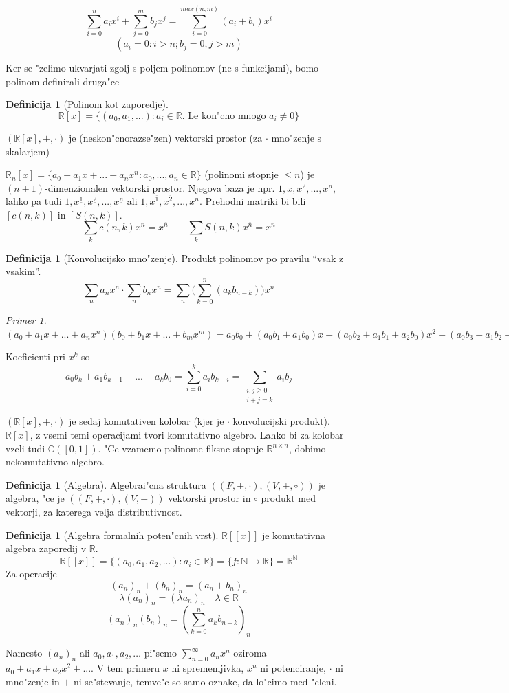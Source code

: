 \documentclass[a4paper,12pt]{article}
\theoremstyle{definition}
\newtheorem{defn}[counter]{Definicija}
\theoremstyle{remark}
\newtheorem*{ex}{Primer}
\newcommand{\N}{\mathbb{N}}
\newcommand{\R}{\mathbb{R}}
\newcommand{\C}{\mathbb{C}}
\begin{document}
\[\sum_{i = 0}^n a_i x^{i} + \sum_{j = 0}^m b_j x^j = \sum_{i = 0}^{max(n, m)}(a_i + b_i)x^{i}\]
\[(a_i = 0: i > n; b_j = 0, j > m)\]

Ker se "zelimo ukvarjati zgolj s poljem polinomov (ne s funkcijami), bomo polinom definirali druga"ce
\begin{defn}[Polinom kot zaporedje]
	\[\R[x] = \{(a_0, a_1, ...): a_i \in \R. \text{ Le kon"cno mnogo }a_i \neq 0\}\]
\end{defn}

$(\R[x], +, \cdot)$ je (neskon"cnorazse"zen) vektorski prostor (za $\cdot$ mno"zenje s skalarjem)

$\R_n[x] = \{a_0 + a_1 x + ... + a_n x^n: a_0, ..., a_n \in \R\}$ (polinomi stopnje $\leqslant n$) je $(n + 1)$-dimenzionalen vektorski prostor. Njegova baza je npr. $1, x, x^2, ..., x^n$, lahko pa tudi $1, x^{\underline{1}}, x^{\underline{2}}, ..., x^{\underline{n}}$ ali $1, x^{\overline{1}}, x^{\overline{2}}, ..., x^{\overline{n}}$. Prehodni matriki bi bili $[c(n, k)]$ in $[S(n, k)]$.
\[
	\sum_k c(n, k) x^n = x^{\overline{n}}
	\qquad
	\sum_k S(n, k) x^{\overline{n}} = x^n
\]

\begin{defn}[Konvolucijsko mno"zenje]
	Produkt polinomov po pravilu ``vsak z vsakim''.
	\[\sum_na_nx^n \cdot \sum_nb_nx^n = \sum_n\big(\sum_{k=0}^n(a_kb_{n-k})\big)x^n\]
\end{defn}
\begin{ex}
	$(a_0 + a_1 x + ... + a_n x^n)(b_0 + b_1 x + ... + b_m x^m) = a_0 b_0 + (a_0 b_1 + a_1 b_0)x + (a_0 b_2 + a_1 b_ 1 + a_2 b_0) x^2 + (a_0 b_3 + a_1 b_2 + a_2 b_1 + a_3 b_0)x^3 + ... + a_n b_m x^{n + m}$
\end{ex}
Koeficienti pri $x^k$ so
\[a_0 b_k + a_1 b_{k - 1} + ... + a_k b_0 = \sum_{i = 0}^k a_i b_{k - i} = \sum_{\substack{i, j \geqslant 0 \\ i + j = k}} a_i b_j\]

$(\R[x], +, \cdot)$ je sedaj komutativen kolobar (kjer je $\cdot$ konvolucijski produkt). $\R[x]$, z vsemi temi operacijami tvori komutativno algebro. Lahko bi za kolobar vzeli tudi $\C([0, 1])$. "Ce vzamemo polinome fiksne stopnje $\R^{n \times n}$, dobimo nekomutativno algebro.

\begin{defn}[Algebra]
	Algebrai"cna struktura $((F, +, \cdot), (V, +, \circ))$ je algebra, "ce je $((F, +, \cdot), (V, +))$ vektorski prostor in $\circ$ produkt med vektorji, za katerega velja distributivnost.
\end{defn}
\begin{defn}[Algebra formalnih poten"cnih vrst]
    $\R[[x]]$ je komutativna algebra zaporedij v $\R$.
    \[\R[[x]] = \{(a_0, a_1, a_2, ...): a_i \in \R\} = \{f: \N \rightarrow \R\} = \R^{\N}\]
	Za operacije
    \[(a_n)_n + (b_n)_n = (a_n + b_n)_n\]
    \[\lambda(a_n)_n = (\lambda a_n)_n \quad \lambda \in \R \]
    \[(a_n)_n (b_n)_n = (\sum_{k = 0}^n a_k b_{n - k})_n\]
\end{defn}
Namesto $(a_n)_n$ ali $a_0, a_1, a_2, \ldots$ pi"semo $\sum_{n = 0}^{\infty} a_n x^n$ oziroma $a_0 + a_1 x + a_2 x^2 + ...$. V tem primeru $x$ ni spremenljivka, $x^n$ ni potenciranje, $\cdot$ ni mno"zenje in $+$ ni se"stevanje, temve"c so samo oznake, da lo"cimo med "cleni.
\end{document}
